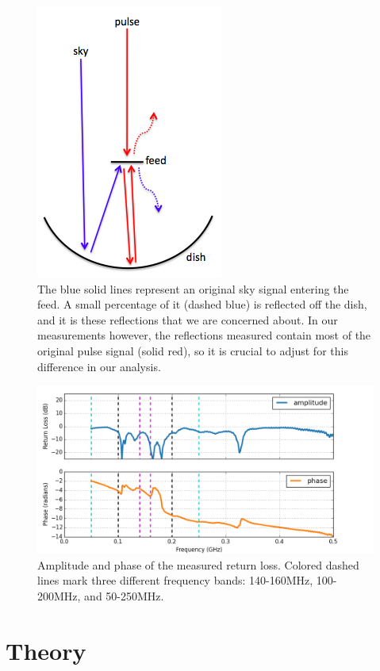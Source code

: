 \documentclass[12pt,preprint]{aastex}
\begin{document}
\begin{figure}
\centering
\includegraphics[totalheight=0.3\textheight]{plots/reflection_cartoon.png}
\caption{The blue solid lines represent an original sky signal entering the feed. A small percentage of it (dashed blue) is reflected off the dish, and it is these reflections that we are concerned about. In our measurements however, the reflections measured contain most of the original pulse signal (solid red), so it is crucial to adjust for this difference in our analysis.}
\label{fig:cartoon}
\end{figure}

\begin{figure}
\centering
\includegraphics[totalheight=0.4\textheight]{plots/frequency_amp_phase_fullbw.png}
\caption{Amplitude and phase of the measured return loss. Colored dashed lines mark three different frequency bands: 140-160MHz, 100-200MHz, and 50-250MHz.}
\label{fig:freq}
\end{figure}



\section{Theory}{\label{sec:theory}}
\end{document}

